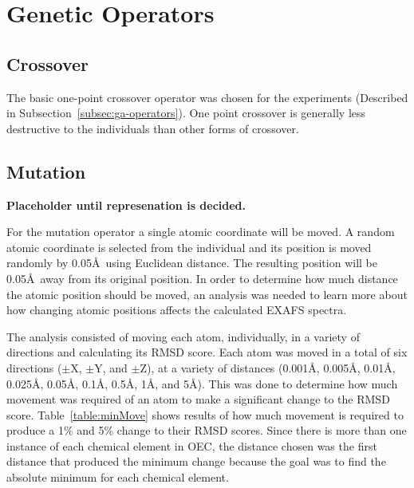 \section{Genetic Operators}

\subsection{Crossover}

The basic one-point crossover operator was chosen for the experiments (Described in Subsection~\ref{subsec:ga-operators}). One point crossover is generally less destructive to the individuals than other forms of crossover. %

\subsection{Mutation}

\textbf{Placeholder until represenation is decided.}

For the mutation operator a single atomic coordinate will be moved. A random atomic coordinate is selected from the individual and its position is moved randomly by 0.05\AA\  using Euclidean distance. The resulting position will be 0.05\AA\ away from its original position. In order to determine how much distance the atomic position should be moved, an analysis was needed to learn more about how changing atomic positions affects the calculated EXAFS spectra.

The analysis consisted of moving each atom, individually, in a variety of directions and calculating its RMSD score. Each atom was moved in a total of six directions ($\pm$X, $\pm$Y, and $\pm$Z), at a variety of distances (0.001\AA, 0.005\AA, 0.01\AA, 0.025\AA, 0.05\AA, 0.1\AA, 0.5\AA, 1\AA, and 5\AA). This was done to determine how much movement was required of an atom to make a significant change to the RMSD score. Table~\ref{table:minMove} shows results of how much movement is required to produce a 1\% and 5\% change to their RMSD scores. Since there is more than one instance of each chemical element in OEC, the distance chosen was the first distance that produced the minimum change because the goal was to find the absolute minimum for each chemical element.

